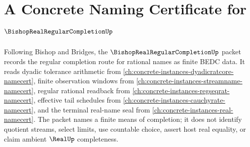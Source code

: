 \chapter{A Concrete Naming Certificate for $\BishopRealRegularCompletionUp$}
\label{ch:concrete-instances-bishop-real-regular-completion-namecert}

Following Bishop and Bridges, the $\BishopRealRegularCompletionUp$ packet records the regular completion route for rational names as finite BEDC data. It reads dyadic tolerance arithmetic from \autoref{ch:concrete-instances-dyadicratcore-namecert}, finite observation windows from \autoref{ch:concrete-instances-streamname-namecert}, regular rational readback from \autoref{ch:concrete-instances-regseqrat-namecert}, effective tail schedules from \autoref{ch:concrete-instances-cauchyrate-namecert}, and the terminal real-name seal from \autoref{ch:concrete-instances-real-namecert}. The packet names a finite means of completion; it does not identify quotient streams, select limits, use countable choice, assert host real equality, or claim ambient $\RealUp$ completeness.


